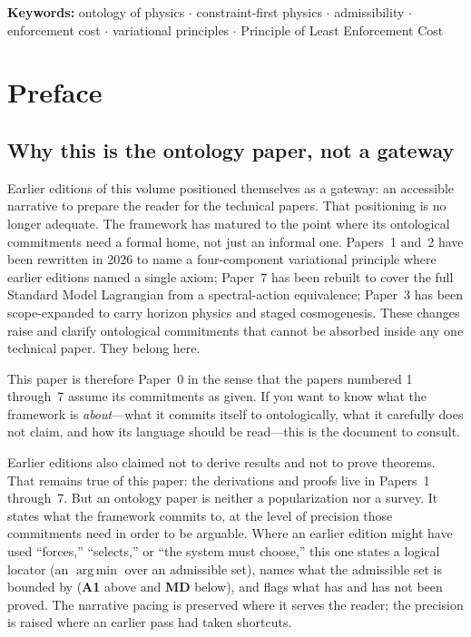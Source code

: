 \documentclass[11pt]{article}
\newcommand{\argmin}{\mathop{\mathrm{arg\,min}}}
\begin{document}
\noindent\textbf{Keywords:} ontology of physics $\cdot$ constraint-first physics $\cdot$ admissibility $\cdot$ enforcement cost $\cdot$ variational principles $\cdot$ Principle of Least Enforcement Cost

\bigskip

\tableofcontents
\bigskip

\section*{Preface}

\subsection*{Why this is the ontology paper, not a gateway}

Earlier editions of this volume positioned themselves as a gateway: an accessible narrative to prepare the reader for the technical papers. That positioning is no longer adequate. The framework has matured to the point where its ontological commitments need a formal home, not just an informal one. Papers~1 and~2 have been rewritten in 2026 to name a four-component variational principle where earlier editions named a single axiom; Paper~7 has been rebuilt to cover the full Standard Model Lagrangian from a spectral-action equivalence; Paper~3 has been scope-expanded to carry horizon physics and staged cosmogenesis. These changes raise and clarify ontological commitments that cannot be absorbed inside any one technical paper. They belong here.

This paper is therefore Paper~0 in the sense that the papers numbered 1 through~7 assume its commitments as given. If you want to know what the framework is \emph{about}---what it commits itself to ontologically, what it carefully does not claim, and how its language should be read---this is the document to consult.

Earlier editions also claimed not to derive results and not to prove theorems. That remains true of this paper: the derivations and proofs live in Papers~1 through~7. But an ontology paper is neither a popularization nor a survey. It states what the framework commits to, at the level of precision those commitments need in order to be arguable. Where an earlier edition might have used ``forces,'' ``selects,'' or ``the system must choose,'' this one states a logical locator (an $\argmin$ over an admissible set), names what the admissible set is bounded by (\textbf{A1} above and \textbf{MD} below), and flags what has and has not been proved. The narrative pacing is preserved where it serves the reader; the precision is raised where an earlier pass had taken shortcuts.
\end{document}
